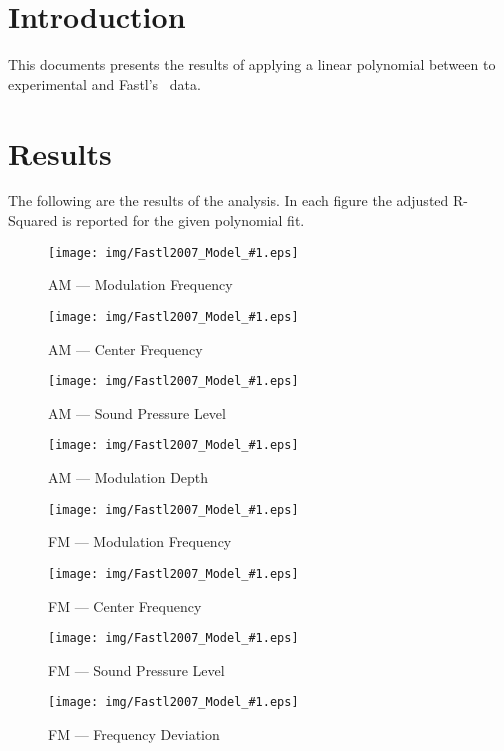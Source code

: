 \documentclass[a4paper]{article}
\newcommand{\figCorr}[2]{
\begin{figure}[ht!]
  \centering
  \texttt{[image: img/Fastl2007\_Model\_\#1.eps]}
  \caption{#2}
\label{fig:#1}
\end{figure}
}
\begin{document}

\section{Introduction} %
\label{sec:introduction}

This documents presents the results of applying a linear polynomial between
to experimental and Fastl's~\cite{Fastl2007Psychoacoustics} data.


\section{Results} %
\label{sec:results}

The following are the results of the analysis. In each figure the adjusted
R-Squared is reported for the given polynomial fit.

\figCorr{AM-fm}{AM --- Modulation Frequency}
\figCorr{AM-fc}{AM --- Center Frequency}
\figCorr{AM-SPL}{AM --- Sound Pressure Level}
\figCorr{AM-md}{AM --- Modulation Depth}
\figCorr{FM-fm}{FM --- Modulation Frequency}
\figCorr{FM-fc}{FM --- Center Frequency}
\figCorr{FM-SPL}{FM --- Sound Pressure Level}
\figCorr{FM-df}{FM --- Frequency Deviation}


\custombibliography{}
\end{document}

